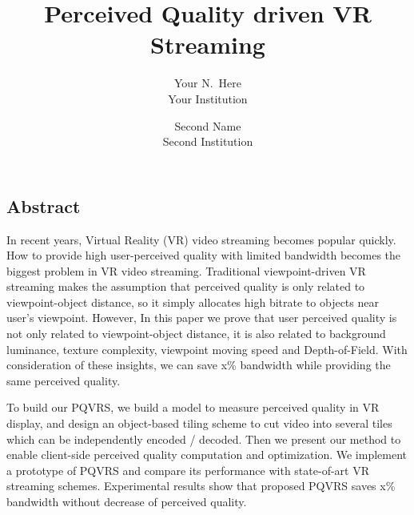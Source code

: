 \documentclass[letterpaper,twocolumn,10pt]{article}
\begin{document}
\date{}

\title{\Large \bf Perceived Quality driven VR Streaming}

\author{
{\rm Your N.\ Here}\\
Your Institution
\and
{\rm Second Name}\\
Second Institution
} %

\maketitle

\thispagestyle{empty}


\subsection*{Abstract}
In recent years, Virtual Reality (VR) video streaming becomes popular quickly. How to provide high user-perceived quality with limited bandwidth becomes the biggest problem in VR video streaming. Traditional viewpoint-driven VR streaming makes the assumption that perceived quality is only related to viewpoint-object distance, so it simply allocates high bitrate to objects near user's viewpoint. However, In this paper we prove that user perceived quality is not only related to viewpoint-object distance, it is also related to background luminance, texture complexity, viewpoint moving speed and Depth-of-Field. With consideration of these insights, we can save x\% bandwidth while providing the same perceived quality.

To build our PQVRS, we build a model to measure perceived quality in VR display, and design an object-based tiling scheme to cut video into several tiles which can be independently encoded / decoded. Then we present our method to enable client-side perceived quality computation and optimization. We implement a prototype of PQVRS and compare its performance with state-of-art VR streaming schemes. Experimental results show that proposed PQVRS saves x\% bandwidth without decrease of perceived quality.











{\footnotesize 
}
\end{document}
